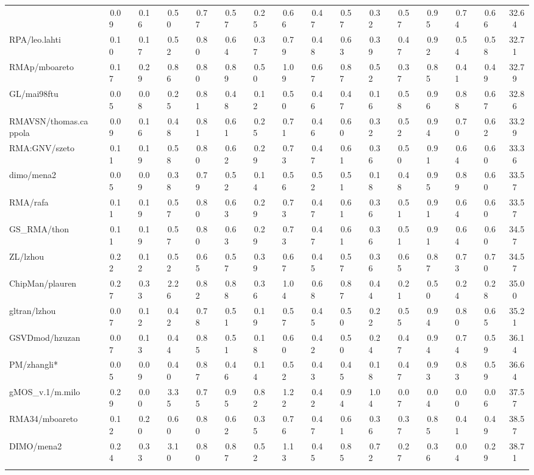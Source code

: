 \begin{table}[hptb]
\begin{center}
\begin{tabular}{|l||c|c|c|c|c|c|c|c|c|c|c|c|c|c|c|}
{ZAM2NBG/magnus.astrand&~~0.09&~~0.16&~~0.50&~~0.77&~~0.57&~~0.25&~~0.66&~~0.47&~~0.57&~~0.32&~~0.57&~~0.95&~~0.74&~~0.66&~32.64\\ 
RPA/leo.lahti&~~0.10&~~0.17&~~0.52&~~0.80&~~0.64&~~0.37&~~0.79&~~0.48&~~0.63&~~0.39&~~0.47&~~0.92&~~0.54&~~0.58&~32.71\\ 
RMAp/mboareto&~~0.17&~~0.29&~~0.86&~~0.80&~~0.89&~~0.50&~~1.09&~~0.67&~~0.87&~~0.52&~~0.37&~~0.85&~~0.41&~~0.49&~32.79\\ 
GL/mai98ftu&~~0.05&~~0.08&~~0.25&~~0.81&~~0.48&~~0.12&~~0.50&~~0.46&~~0.47&~~0.16&~~0.58&~~0.96&~~0.88&~~0.67&~32.86\\ 
RMAVSN/thomas.cappola&~~0.09&~~0.16&~~0.48&~~0.81&~~0.61&~~0.25&~~0.71&~~0.46&~~0.60&~~0.32&~~0.52&~~0.94&~~0.70&~~0.62&~33.29\\ 
RMA:GNV/szeto&~~0.11&~~0.19&~~0.58&~~0.80&~~0.62&~~0.29&~~0.73&~~0.47&~~0.61&~~0.36&~~0.50&~~0.91&~~0.64&~~0.60&~33.36\\ 
dimo/mena2&~~0.05&~~0.09&~~0.38&~~0.79&~~0.52&~~0.14&~~0.56&~~0.52&~~0.51&~~0.18&~~0.48&~~0.95&~~0.89&~~0.60&~33.57\\ 
RMA/rafa&~~0.11&~~0.19&~~0.57&~~0.80&~~0.63&~~0.29&~~0.73&~~0.47&~~0.61&~~0.36&~~0.51&~~0.91&~~0.64&~~0.60&~33.57\\ 
GS_RMA/thon&~~0.11&~~0.19&~~0.57&~~0.80&~~0.63&~~0.29&~~0.73&~~0.47&~~0.61&~~0.36&~~0.51&~~0.91&~~0.64&~~0.60&~34.57\\ 
ZL/lzhou&~~0.22&~~0.12&~~0.52&~~0.65&~~0.57&~~0.39&~~0.67&~~0.45&~~0.57&~~0.36&~~0.65&~~0.87&~~0.73&~~0.70&~34.57\\ 
ChipMan/plauren&~~0.27&~~0.33&~~2.26&~~0.82&~~0.88&~~0.36&~~1.04&~~0.68&~~0.87&~~0.44&~~0.21&~~0.50&~~0.24&~~0.28&~35.00\\ 
gltran/lzhou&~~0.07&~~0.12&~~0.42&~~0.78&~~0.51&~~0.19&~~0.57&~~0.45&~~0.50&~~0.22&~~0.55&~~0.94&~~0.80&~~0.65&~35.21\\ 
GSVDmod/hzuzan&~~0.07&~~0.13&~~0.44&~~0.85&~~0.51&~~0.18&~~0.60&~~0.42&~~0.50&~~0.24&~~0.47&~~0.94&~~0.74&~~0.59&~36.14\\ 
PM/zhangli*&~~0.05&~~0.09&~~0.40&~~0.87&~~0.46&~~0.14&~~0.52&~~0.43&~~0.45&~~0.18&~~0.47&~~0.93&~~0.83&~~0.59&~36.64\\ 
gMOS_v.1/m.milo&~~0.29&~~0.00&~~3.35&~~0.75&~~0.95&~~0.82&~~1.22&~~0.42&~~0.94&~~1.04&~~0.07&~~0.04&~~0.00&~~0.06&~37.57\\ 
RMA34/mboareto&~~0.12&~~0.20&~~0.60&~~0.80&~~0.62&~~0.35&~~0.76&~~0.47&~~0.61&~~0.36&~~0.37&~~0.85&~~0.41&~~0.49&~38.57\\ 
DIMO/mena2&~~0.24&~~0.33&~~3.10&~~0.80&~~0.87&~~0.52&~~1.13&~~0.45&~~0.85&~~0.72&~~0.27&~~0.36&~~0.04&~~0.29&~38.71\\ 
}
\end{tabular}
\end{center}
\end{table}
